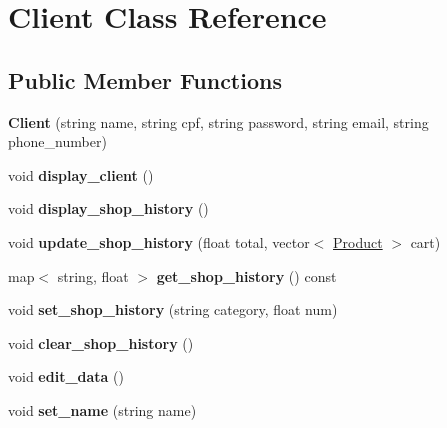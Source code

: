 \hypertarget{class_client}{}\section{Client Class Reference}
\label{class_client}
\subsection*{Public Member Functions}
\begin{DoxyCompactItemize}
\item 
\mbox{\label{class_client_ab2929c49c95b34522d64c4e96d360879}} 
{\bfseries Client} (string name, string cpf, string password, string email, string phone\+\_\+number)
\item 
\mbox{\label{class_client_a87dbfbc79150d8c049debeba5638f284}} 
void {\bfseries display\+\_\+client} ()
\item 
\mbox{\label{class_client_affc6b43d9fdabdd3688ce567575f0502}} 
void {\bfseries display\+\_\+shop\+\_\+history} ()
\item 
\mbox{\label{class_client_a4e9b9b046dfe95ba053222d7a5ffcbe9}} 
void {\bfseries update\+\_\+shop\+\_\+history} (float total, vector$<$ \hyperlink{class_product}{Product} $>$ cart)
\item 
\mbox{\label{class_client_a2e322a2336af22a2bd46021921e631e0}} 
map$<$ string, float $>$ {\bfseries get\+\_\+shop\+\_\+history} () const
\item 
\mbox{\label{class_client_a45541dfe7ac9f82bc5f33ae30ac21a31}} 
void {\bfseries set\+\_\+shop\+\_\+history} (string category, float num)
\item 
\mbox{\label{class_client_aca30bb0270613fc8e028c90dd4f8600b}} 
void {\bfseries clear\+\_\+shop\+\_\+history} ()
\item 
\mbox{\label{class_client_a8da0103c12583c36c805df629f003a0b}} 
void {\bfseries edit\+\_\+data} ()
\item 
\mbox{\label{class_client_a2a05d3200cca6da135ec544459e06069}} 
void {\bfseries set\+\_\+name} (string name)

\end{DoxyCompactItemize}
